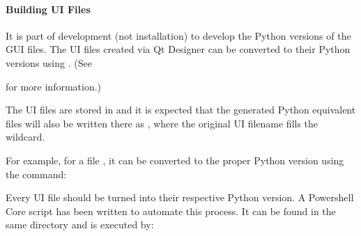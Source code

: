 \documentclass[letterpaper,11pt,english]{sphinxmanual}
\begin{document}
\paragraph{Building UI Files}
\label{\detokenize{technical/architecture/graphical_user_interface:building-ui-files}}\label{\detokenize{technical/architecture/graphical_user_interface:technical-architecture-graphical-user-interface-building-ui-files}}
\sphinxAtStartPar
It is part of development (not installation) to develop the Python versions of
the GUI files. The UI files created via Qt Designer can be converted to their
Python versions using . (See
%
\begin{footnote}[44]\sphinxAtStartFootnote
{}
%
\end{footnote}
for more information.)

\sphinxAtStartPar
The UI files are stored in  and it
is expected that the generated Python equivalent files will also be written
there as , where the original UI filename fills the wildcard.

\sphinxAtStartPar
For example, for a file , it can be converted to the proper Python
version using the command:

\begin{sphinxVerbatim}[commandchars=\\\{\}]
   
\end{sphinxVerbatim}

\sphinxAtStartPar
Every UI file should be turned into their respective Python version. A
Powershell Core script has been written to automate this process. It can be
found in the same directory and is executed by:

\begin{sphinxVerbatim}[commandchars=\\\{\}]
 
\end{sphinxVerbatim}
\end{document}
